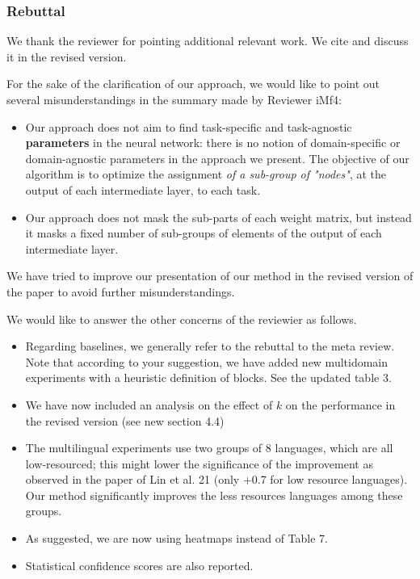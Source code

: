 \documentclass[12pt,times,a4paper,twoside]{article}
\theoremstyle{definition}
\begin{document}
\subsubsection*{Rebuttal}
{\color{blue}%
We thank the reviewer for pointing additional relevant work. We cite and discuss it in the revised version.

For the sake of the clarification of our approach, we would like to point out several misunderstandings in the summary made by Reviewer iMf4:
\begin{itemize}
\item Our approach does not aim to find task-specific and task-agnostic \textbf{parameters} in the neural network: there is no notion of domain-specific or domain-agnostic parameters in the approach we present. The objective of our algorithm is to optimize the assignment \emph{of a sub-group of "nodes"}, at the output of each intermediate layer, to each task.
\item Our approach does not mask the sub-parts of each weight matrix, but instead it masks a fixed number of sub-groups of elements of the output of each intermediate layer.
\end{itemize}
We have tried to improve our presentation of our method in the revised version of the paper to avoid further misunderstandings.

We would like to answer the other concerns of the reviewier as follows. 
\begin{itemize} 
\item Regarding baselines, we generally refer to the rebuttal to the meta review. Note that according to your suggestion, we have added new multidomain experiments with a heuristic definition of blocks. See the updated table $3$.
\item We have now included an analysis on the effect of $k$ on the performance in the revised version (see new section 4.4)
\item The multilingual experiments use two groups of $8$ languages, which are all low-resourced; this might lower the significance of the improvement as observed in the paper of Lin et al. 21 (only +0.7 for low resource languages). Our method significantly improves the less resources languages among these groups.
\item As suggested, we are now using heatmaps instead of Table 7.
\item Statistical confidence scores are also reported. 
\end{itemize}
}
\end{document}
